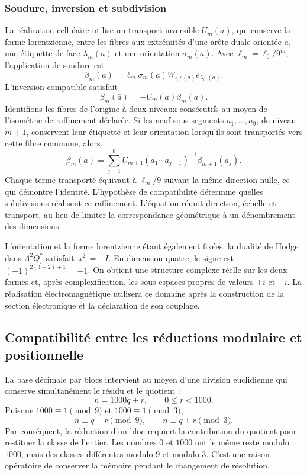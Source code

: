 \subsubsection{Soudure, inversion et subdivision}

La réalisation cellulaire utilise un transport inversible \(U_m(a)\),
qui conserve la forme lorentzienne, entre les fibres aux extrémités d'une
arête duale orientée \(a\), une étiquette
de face \(\lambda_m(a)\) et une orientation \(\sigma_m(a)\).
Avec \(\ell_m=\ell_0/9^m\), l'application de soudure est
\[
 \beta_m(a)=\ell_m\sigma_m(a)
 W_{\square,s(a)}e_{\lambda_m(a)}.
\]
L'inversion compatible satisfait
\[
 \beta_m(\bar a)=-U_m(a)\beta_m(a).
\]
Identifions les fibres de l'origine à deux niveaux consécutifs au moyen de l'isométrie de raffinement déclarée. Si les neuf sous-segments \(a_1,\ldots,a_9\), de niveau \(m+1\), conservent leur étiquette et leur orientation lorsqu'ils sont transportés vers cette fibre commune, alors
\begin{equation}
 \beta_m(a)=\sum_{j=1}^9
 U_{m+1}(a_1\cdots a_{j-1})^{-1}\beta_{m+1}(a_j).
 \label{eq:soldadura-refinamiento}
\end{equation}
Chaque terme transporté équivaut à \(\ell_m/9\) suivant la même
direction nulle, ce qui démontre l'identité. L'hypothèse de
compatibilité détermine quelles subdivisions réalisent ce raffinement.
L'équation réunit direction, échelle et transport, au lieu de limiter
la correspondance géométrique à un dénombrement des dimensions.

L'orientation et la forme lorentzienne étant également fixées, la dualité de Hodge dans \(\Lambda^2Q_\square^*\) satisfait \(\star^2=-I\). En dimension quatre, le signe est \((-1)^{2(4-2)+1}=-1\). On obtient une structure complexe réelle sur les deux-formes et, après complexification, les sous-espaces propres de valeurs \(+i\) et \(-i\). La réalisation électromagnétique utilisera ce domaine après la construction de la section électronique et la déclaration de son couplage.

\subsection{Compatibilité entre les réductions modulaire et positionnelle}

La base décimale par blocs intervient au moyen d'une division euclidienne
qui conserve simultanément le résidu et le quotient :
\[
 n=1000q+r,\qquad 0\le r<1000.
\]
Puisque \(1000\equiv1\pmod9\) et \(1000\equiv1\pmod3\),
\[
 n\equiv q+r\pmod9,\qquad n\equiv q+r\pmod3.
\]
Par conséquent, la réduction d'un bloc requiert la contribution du
quotient pour restituer la classe de l'entier. Les nombres \(0\) et
\(1000\) ont le même reste modulo \(1000\), mais des classes différentes
modulo \(9\) et modulo \(3\). C'est une raison opératoire de conserver
la mémoire pendant le changement de résolution.

